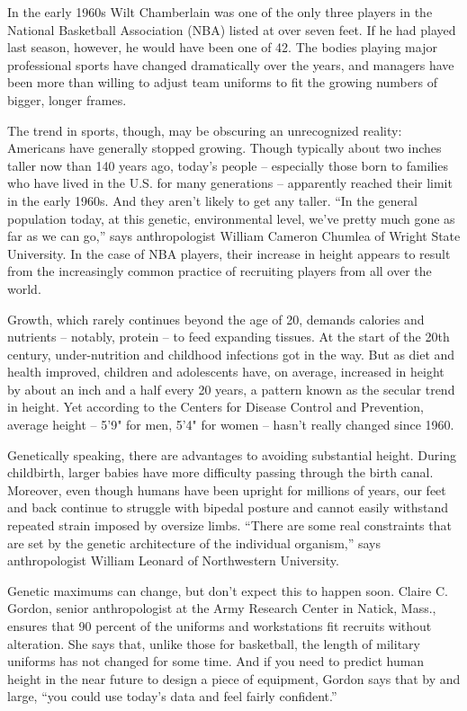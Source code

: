 In the early 1960s Wilt Chamberlain was one of the only three players in the National Basketball Association (NBA) listed at over seven feet. If he had played last season, however, he would have been one of 42. The bodies playing major professional sports have changed dramatically over the years, and managers have been more than willing to adjust team uniforms to fit the growing numbers of bigger, longer frames.


The trend in sports, though, may be obscuring an unrecognized reality: Americans have generally stopped growing. Though typically about two inches taller now than 140 years ago, today's people – especially those born to families who have lived in the U.S. for many generations – apparently reached their limit in the early 1960s. And they aren't likely to get any taller. ``In the general population today, at this genetic, environmental level, we've pretty much gone as far as we can go,'' says anthropologist William Cameron Chumlea of Wright State University. In the case of NBA players, their increase in height appears to result from the increasingly common practice of recruiting players from all over the world.


Growth, which rarely continues beyond the age of 20, demands calories and nutrients – notably, protein – to feed expanding tissues. At the start of the 20th century, under-nutrition and childhood infections got in the way. But as diet and health improved, children and adolescents have, on average, increased in height by about an inch and a half every 20 years, a pattern known as the secular trend in height. Yet according to the Centers for Disease Control and Prevention, average height – 5'9" for men, 5'4" for women – hasn't really changed since 1960.


Genetically speaking, there are advantages to avoiding substantial height. During childbirth, larger babies have more difficulty passing through the birth canal. Moreover, even though humans have been upright for millions of years, our feet and back continue to struggle with bipedal posture and cannot easily withstand repeated strain imposed by oversize limbs. ``There are some real constraints that are set by the genetic architecture of the individual organism,'' says anthropologist William Leonard of Northwestern University.


Genetic maximums can change, but don't expect this to happen soon. Claire C. Gordon, senior anthropologist at the Army Research Center in Natick, Mass., ensures that 90 percent of the uniforms and workstations fit recruits without alteration. She says that, unlike those for basketball, the length of military uniforms has not changed for some time. And if you need to predict human height in the near future to design a piece of equipment, Gordon says that by and large, ``you could use today's data and feel fairly confident.''